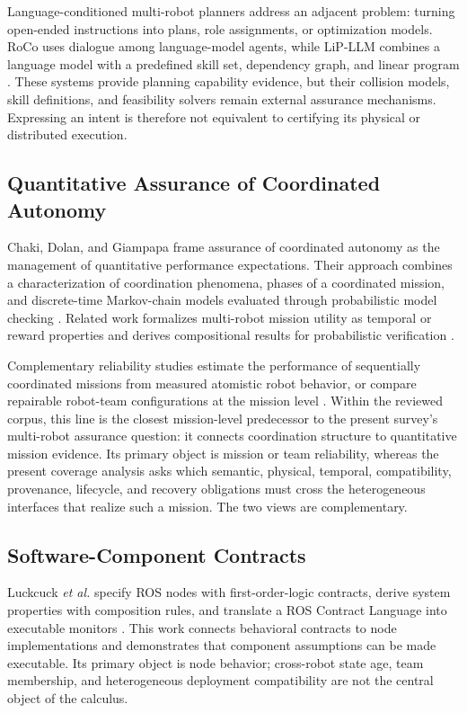 Language-conditioned multi-robot planners address an adjacent problem: turning
open-ended instructions into plans, role assignments, or optimization models.
RoCo uses dialogue among language-model agents, while LiP-LLM combines a
language model with a predefined skill set, dependency graph, and linear
program \cite{mandi2023roco,obata2024lipllm}.  These systems provide planning
capability evidence, but their collision models, skill definitions, and
feasibility solvers remain external assurance mechanisms.  Expressing an
intent is therefore not equivalent to certifying its physical or distributed
execution.

\subsection{Quantitative Assurance of Coordinated Autonomy}

Chaki, Dolan, and Giampapa frame assurance of coordinated autonomy as the
management of quantitative performance expectations.  Their approach combines
a characterization of coordination phenomena, phases of a coordinated mission,
and discrete-time Markov-chain models evaluated through probabilistic model
checking \cite{chaki2013assurance}.  Related work formalizes multi-robot mission
utility as temporal or reward properties and derives compositional results for
probabilistic verification \cite{chaki2013probabilistic}.

Complementary reliability studies estimate the performance of sequentially
coordinated missions from measured atomistic robot behavior, or compare
repairable robot-team configurations at the mission level
\cite{porter2013reliability,stancliff2006missionreliability}.  Within the
reviewed corpus, this line is the closest mission-level predecessor to the
present survey's multi-robot assurance question: it connects coordination
structure to quantitative mission evidence.  Its primary object is mission or
team reliability, whereas the present coverage analysis asks which semantic,
physical, temporal, compatibility, provenance, lifecycle, and recovery
obligations must cross the heterogeneous interfaces that realize such a
mission.  The two views are complementary.

\subsection{Software-Component Contracts}

Luckcuck \emph{et al.} specify ROS nodes with first-order-logic contracts,
derive system properties with composition rules, and translate a ROS Contract
Language into executable monitors \cite{luckcuck2026compositional}.  This work
connects behavioral contracts to node implementations and demonstrates that
component assumptions can be made executable.  Its primary object is node
behavior; cross-robot state age, team membership, and heterogeneous deployment
compatibility are not the central object of the calculus.

